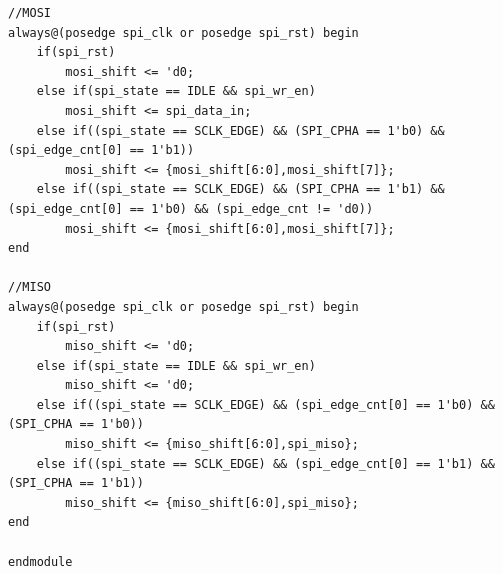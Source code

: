 \documentclass[a4paper,10pt]{article}
\begin{document}
\begin{lstlisting}[caption=spi_master.v]
//MOSI
always@(posedge spi_clk or posedge spi_rst)	begin
	if(spi_rst)
        mosi_shift <= 'd0;
    else if(spi_state == IDLE && spi_wr_en)
        mosi_shift <= spi_data_in;
    else if((spi_state == SCLK_EDGE) && (SPI_CPHA == 1'b0) && (spi_edge_cnt[0] == 1'b1))
        mosi_shift <= {mosi_shift[6:0],mosi_shift[7]};
    else if((spi_state == SCLK_EDGE) && (SPI_CPHA == 1'b1) && (spi_edge_cnt[0] == 1'b0) && (spi_edge_cnt != 'd0))
        mosi_shift <= {mosi_shift[6:0],mosi_shift[7]};
end

//MISO
always@(posedge spi_clk or posedge spi_rst)	begin
	if(spi_rst)
        miso_shift <= 'd0;
    else if(spi_state == IDLE && spi_wr_en)
        miso_shift <= 'd0;
    else if((spi_state == SCLK_EDGE) && (spi_edge_cnt[0] == 1'b0) && (SPI_CPHA == 1'b0))
        miso_shift <= {miso_shift[6:0],spi_miso};
    else if((spi_state == SCLK_EDGE) && (spi_edge_cnt[0] == 1'b1) && (SPI_CPHA == 1'b1))
        miso_shift <= {miso_shift[6:0],spi_miso};
end

endmodule 
\end{lstlisting}
\end{document}

